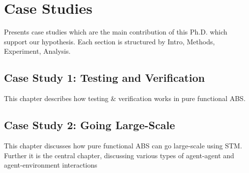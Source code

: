 \section{Case Studies}
Presents case studies which are the main contribution of this Ph.D. which support our hypothesis. Each section is structured by Intro, Methods, Experiment, Analysis.

\subsection{Case Study 1: Testing and Verification}
This chapter describes how testing \& verification works in pure functional ABS.

\subsection{Case Study 2: Going Large-Scale}
This chapter discusses how pure functional ABS can go large-scale using STM. Further it is the central chapter, discussing various types of agent-agent and agent-environment interactions

